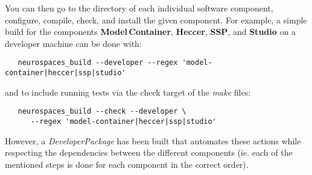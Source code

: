 \documentclass[12pt]{article}
\begin{document}
You can then go to the directory of each individual software component, configure, compile, check, and install the given component. For example, a simple build for the components {\bf Model\,Container}, {\bf Heccer}, {\bf SSP}, and {\bf Studio} on a developer machine can be done with:  
\begin{verbatim}
   neurospaces_build --developer --regex 'model-container|heccer|ssp|studio'
\end{verbatim}
and to include running tests via the check target of the {\it make} files:
\begin{verbatim}
   neurospaces_build --check --developer \
      --regex 'model-container|heccer|ssp|studio'
\end{verbatim}
However, a {\it DeveloperPackage} has been built that automates these actions while respecting the dependencies between the different components (ie. each of the mentioned steps is done for each component in the correct order).





\end{document}
